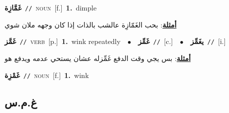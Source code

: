 \documentclass[10pt,a4paper,twoside]{article} %
\begin{document}
\begin{multicols}{2}
{\setlength\topsep{0pt}\textbf{\foreignlanguage{arabic}{غَمَّازِة}}\ {\color{gray}\texttt{//}\color{black}}\ \textsc{noun}\ [f.]\ \textbf{1.}~dimple\  \begin{flushright}\color{gray}\foreignlanguage{arabic}{\textbf{\underline{\foreignlanguage{arabic}{أمثلة}}}: بحب الغَمّازِة عالشب بالذات إذا كان وجهه ملان شوي}\end{flushright}\color{black}} \vspace{2mm}

{\setlength\topsep{0pt}\textbf{\foreignlanguage{arabic}{غَمَّز}}\ {\color{gray}\texttt{//}\color{black}}\ \textsc{verb}\ [p.]\ \textbf{1.}~wink repeatedly\ \ $\bullet$\ \ \setlength\topsep{0pt}\textbf{\foreignlanguage{arabic}{غَمِّز}}\ {\color{gray}\texttt{//}\color{black}}\ [c.]\ \ $\bullet$\ \ \setlength\topsep{0pt}\textbf{\foreignlanguage{arabic}{يغَمِّز}}\ {\color{gray}\texttt{//}\color{black}}\ [i.]\  \begin{flushright}\color{gray}\foreignlanguage{arabic}{\textbf{\underline{\foreignlanguage{arabic}{أمثلة}}}: بس يجي وقت الدفع غَمِّزله عشان يستحي عدمه ويدفع هو}\end{flushright}\color{black}} \vspace{2mm}

{\setlength\topsep{0pt}\textbf{\foreignlanguage{arabic}{غَمْزِة}}\ {\color{gray}\texttt{//}\color{black}}\ \textsc{noun}\ [f.]\ \textbf{1.}~wink\ } \vspace{2mm}

\vspace{-3mm}
\subsection*{\color{blue}\foreignlanguage{arabic}{غ.م.س}\color{blue}{}} 


\end{multicols}
\end{document}
